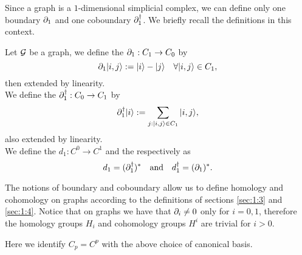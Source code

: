 \documentclass[../2.tex]{subfiles}
\begin{document}
    
    Since a graph is a $1$-dimensional simplicial complex, we can define only one boundary $\partial_1$ and one coboundary $\partial_1^\dagger$.
    We briefly recall the definitions in this context.

    \begin{defn}
        Let $\mathcal{G}$ be a graph, we define the  $\partial_1 : C_1 \to C_0$ by 
        \[ \partial_1| i,j \rangle := | i \rangle - | j \rangle \quad \forall | i,j \rangle \in C_1,\]
        then extended by linearity.\\
        We define the  $\partial^\dagger_1 : C_0 \to C_1$ by 
        \[ \partial^\dagger_1| i \rangle := \sum_{j : | i,j \rangle \in C_1} | i,j \rangle,\]
        also extended by linearity.\\
        We define the  $d_1 : C^0 \to C^1$ and the  respectively as
        \[ d_1 = (\partial_1^\dagger)^* \quad \text{and} \quad d_1^\dagger = (\partial_1)^* .\]
        \label{def:2:2:2}
    \end{defn}

    The notions of boundary and coboundary allow us to define homology and cohomology on graphs according to the definitions of sections \ref{sec:1:3} and \ref{sec:1:4}.
    Notice that on graphs we have that $\partial_i \neq 0$ only for $i = 0,1$, therefore the homology groups $H_i$ and cohomology groups $H^i$ are trivial for $i > 0$.

    Here we identify $C_p = C^p$ with the above choice of
    canonical basis.




\end{document}

